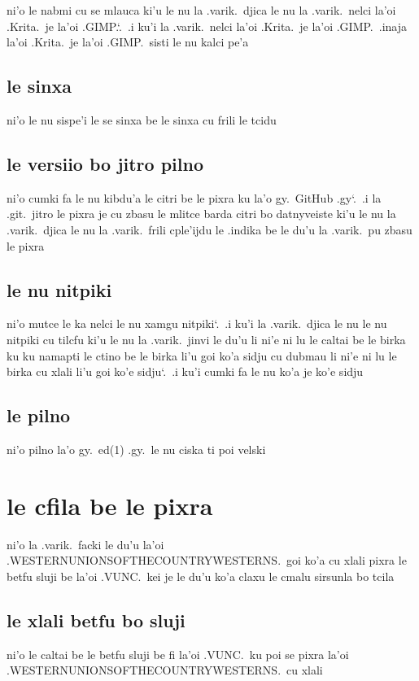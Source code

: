 \documentclass{report}
\newcommand\sds{\spacefactor\sfcode`.\ \space}
\begin{document}
ni'o le nabmi cu se mlauca ki'u le nu la .varik.\ djica le nu la .varik.\ nelci la'oi .Krita.\ je la'oi .GIMP.\sds  .i ku'i la .varik.\ nelci la'oi .Krita.\ je la'oi .GIMP.\ .inaja la'oi .Krita.\ je la'oi .GIMP.\ sisti le nu kalci pe'a

\subsection{le sinxa}
ni'o le nu sispe'i le se sinxa be le sinxa cu frili le tcidu

\subsection{le versiio bo jitro pilno}
ni'o cumki fa le nu kibdu'a le citri be le pixra ku la'o gy.\ GitHub .gy\sds  .i la .git.\ jitro le pixra je cu zbasu le mlitce barda citri bo datnyveiste ki'u le nu la .varik.\ djica le nu la .varik.\ frili cple'ijdu le .indika be le du'u la .varik.\ pu zbasu le pixra

\subsection{le nu nitpiki}
ni'o mutce le ka nelci le nu xamgu nitpiki\sds  .i ku'i la .varik.\ djica le nu le nu nitpiki cu tilcfu ki'u le nu la .varik.\ jinvi le du'u li ni'e ni lu le caltai be le birka ku ku namapti le ctino be le birka li'u goi ko'a sidju cu dubmau li ni'e ni lu le birka cu xlali li'u goi ko'e sidju\sds  .i ku'i cumki fa le nu ko'a je ko'e sidju

\subsection{le pilno}
ni'o pilno la'o gy.\ ed(1) .gy.\ le nu ciska ti poi velski

\section{le cfila be le pixra}
ni'o la .varik.\ facki le du'u la'oi .WESTERNUNIONSOFTHECOUNTRYWESTERNS.\ goi ko'a cu xlali pixra le betfu sluji be la'oi .VUNC.\ kei je le du'u ko'a claxu le cmalu sirsunla bo tcila

\subsection{le xlali betfu bo sluji}
ni'o le caltai be le betfu sluji be fi la'oi .VUNC.\ ku poi se pixra la'oi .WESTERNUNIONSOFTHECOUNTRYWESTERNS.\ cu xlali
\end{document}
